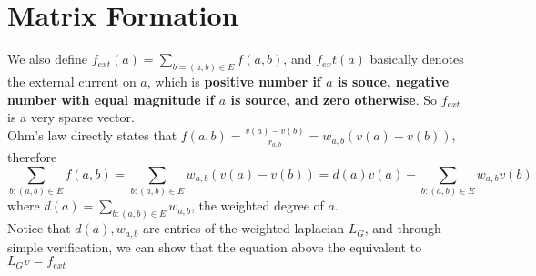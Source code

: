 \documentclass[12pt]{article}
\begin{document}
\section{Matrix Formation}
We also define $ f _ { e x t } ( a ) = \sum _ { b = ( a , b ) \in E } f ( a , b )$, and $f_{ex}t(a)$ basically denotes the external current on $a$, which is \textbf{positive number if $a$ is souce, negative number with equal magnitude if $a$ is source, and zero otherwise}. So $f_{ext}$ is a very sparse vector.\\
\newline
Ohm's law directly states that $f ( a , b ) = \frac { v ( a ) - v ( b ) } { r _ { a , b } } = w _ { a , b } ( v ( a ) - v ( b ) )$, therefore $$\sum _ { b : ( a , b ) \in E } f ( a , b ) = \sum _ { b : ( a , b ) \in E } w _ { a , b } ( v ( a ) - v ( b ) ) = d ( a ) v ( a ) - \sum _ { b : ( a , b ) \in E } w _ { a, b  } v ( b )$$ where $d(a) = \sum_{b : ( a , b ) \in E }w_{a, b}$, the weighted degree of $a$.\\
\newline
Notice that $d(a), w_{a, b}$ are entries of the weighted laplacian $L_G$, and through simple verification, we can show that the equation above the equivalent to $L_Gv = f_{ext}$
\end{document}
